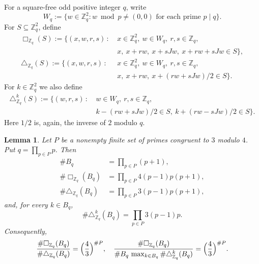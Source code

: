 \documentclass[11pt,reqno]{amsart}
\newtheorem{lemma}[theorem]{Lemma}
\numberwithin{equation}{section}
\begin{document}
For a square-free odd positive integer $q$, write
\[ W_q:=\{w\in\mathbb{Z}_q^2:
w\bmod p\ne(0,0)\text{ for each prime }p\mid q\}. \]
For $S\subseteq\mathbb{Z}_q^2$, define
\begin{align*}
\Box_{\mathbb{Z}_q}(S):=\{(x,w,r,s) \,:\ &x\in\mathbb{Z}_q^2,
\ w\in W_q,
\ r,s\in\mathbb{Z}_q,\\
&x,\ x+rw,\ x+sJw,\ x+rw+sJw\in S\},\\
\triangle_{\mathbb{Z}_q}(S):=\{(x,w,r,s) \,:\ &x\in\mathbb{Z}_q^2,
\ w\in W_q,
\ r,s\in\mathbb{Z}_q,\\
&x,\ x+rw,\ x+(rw+sJw)/2\in S\}.
\end{align*}
For $k\in\mathbb{Z}_q^2$ we also define
\begin{align*}
\triangle^k_{\mathbb{Z}_q}(S) := \{(w,r,s) \,:\ &w\in W_q,
\ r,s\in\mathbb{Z}_q,\\
& k-(rw+sJw)/2\in S, \ k+(rw-sJw)/2\in S\}.
\end{align*}
Here $1/2$ is, again, the inverse of $2$ modulo $q$.

\begin{lemma}\label{lm:crt}
Let $P$ be a nonempty finite set of primes congruent to $3$ modulo $4$. Put $q=\prod_{p\in P}p$. Then
\begin{align*}
\#B_q & = \prod_{p\in P} (p+1), \\
\#\Box_{\mathbb{Z}_q}(B_q) & = \prod_{p\in P} 4(p-1)p(p+1), \\
\#\triangle_{\mathbb{Z}_q}(B_q) & = \prod_{p\in P} 3(p-1)p(p+1),
\end{align*}
and, for every $k\in B_q$,
\[ \#\triangle^k_{\mathbb{Z}_q}(B_q) = \prod_{p\in P} 3(p-1)p. \]
Consequently,
\[ \frac{\#\Box_{\mathbb{Z}_q}(B_q)}{\#\triangle_{\mathbb{Z}_q}(B_q)} = \Bigl(\frac{4}{3}\Bigr)^{\#P},
\quad \frac{\#\Box_{\mathbb{Z}_q}(B_q)}{\#B_q\,\max_{k\in B_q}\#\triangle^k_{\mathbb{Z}_q}(B_q)} = \Bigl(\frac{4}{3}\Bigr)^{\#P}. \]
\end{lemma}
\end{document}
